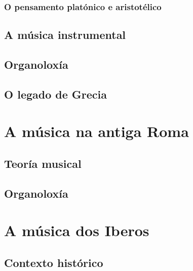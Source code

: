 \documentclass[a4paper, twoside]{templates/ociamthesis}
\begin{document}
\hypertarget{o-pensamento-platuxf3nico-e-aristotuxe9lico}{%
\subsubsection{O pensamento platónico e aristotélico}\label{o-pensamento-platuxf3nico-e-aristotuxe9lico}}

\hypertarget{a-muxfasica-instrumental}{%
\subsection{A música instrumental}\label{a-muxfasica-instrumental}}

\hypertarget{organoloxuxeda}{%
\subsection{Organoloxía}\label{organoloxuxeda}}

\hypertarget{o-legado-de-grecia}{%
\subsection{O legado de Grecia}\label{o-legado-de-grecia}}

\hypertarget{a-muxfasica-na-antiga-roma}{%
\section{A música na antiga Roma}\label{a-muxfasica-na-antiga-roma}}

\hypertarget{teoruxeda-musical}{%
\subsection{Teoría musical}\label{teoruxeda-musical}}

\hypertarget{organoloxuxeda-1}{%
\subsection{Organoloxía}\label{organoloxuxeda-1}}

\hypertarget{a-muxfasica-dos-iberos}{%
\section{A música dos Iberos}\label{a-muxfasica-dos-iberos}}

\hypertarget{contexto-histuxf3rico}{%
\subsection{Contexto histórico}\label{contexto-histuxf3rico}}
\end{document}
